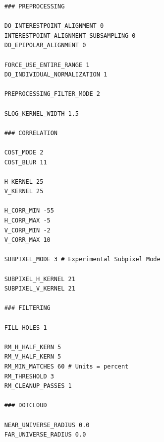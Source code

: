\begin{verbatim}
    ### PREPROCESSING

    DO_INTERESTPOINT_ALIGNMENT 0
    INTERESTPOINT_ALIGNMENT_SUBSAMPLING 0
    DO_EPIPOLAR_ALIGNMENT 0

    FORCE_USE_ENTIRE_RANGE 1
    DO_INDIVIDUAL_NORMALIZATION 1

    PREPROCESSING_FILTER_MODE 2

    SLOG_KERNEL_WIDTH 1.5

    ### CORRELATION

    COST_MODE 2
    COST_BLUR 11

    H_KERNEL 25
    V_KERNEL 25

    H_CORR_MIN -55
    H_CORR_MAX -5
    V_CORR_MIN -2
    V_CORR_MAX 10

    SUBPIXEL_MODE 3 # Experimental Subpixel Mode

    SUBPIXEL_H_KERNEL 21
    SUBPIXEL_V_KERNEL 21

    ### FILTERING

    FILL_HOLES 1

    RM_H_HALF_KERN 5
    RM_V_HALF_KERN 5
    RM_MIN_MATCHES 60 # Units = percent
    RM_THRESHOLD 3
    RM_CLEANUP_PASSES 1

    ### DOTCLOUD

    NEAR_UNIVERSE_RADIUS 0.0
    FAR_UNIVERSE_RADIUS 0.0
\end{verbatim}
